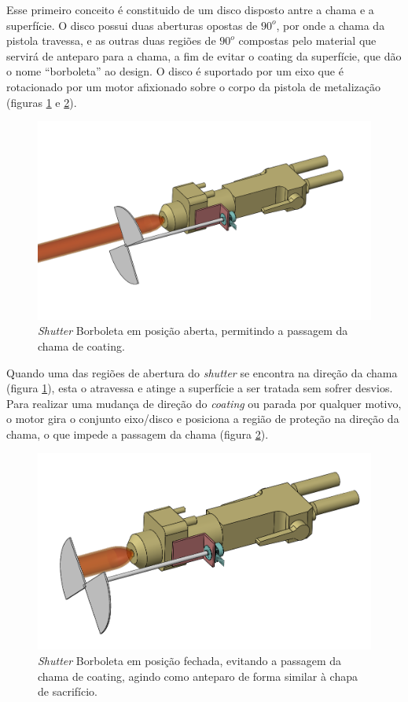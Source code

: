 Esse primeiro conceito é constituido de um disco disposto antre a chama e a
superfície. O disco possui duas aberturas opostas de $90^o$, por onde a chama da
pistola travessa, e as outras duas regiões de $90^o$ compostas pelo material que
servirá de anteparo para a chama, a fim de evitar o coating da superfície, que
dão o nome ``borboleta'' ao design.
O disco é suportado por um eixo que é rotacionado por um motor afixionado sobre o
corpo da pistola de metalização (figuras \ref{fig::borboleta_aberta} e
\ref{fig::borboleta_fechada}).

\begin{figure}[h!]
\centering
	\includegraphics[width=\columnwidth]{figs/estudo/shutter/Shutter_Borboleta_Aberto}
	\caption{\textit{Shutter} Borboleta em posição aberta, permitindo a passagem da chama
	de coating.}
	\label{fig::borboleta_aberta}
\end{figure}

Quando uma das regiões de abertura do \textit{shutter} se encontra na direção da
chama (figura \ref{fig::borboleta_aberta}), esta o atravessa e atinge a
superfície a ser tratada sem sofrer desvios. Para realizar uma mudança de
direção do \textit{coating} ou parada por qualquer motivo, o motor gira o conjunto
eixo/disco e posiciona a região de proteção na direção da chama, o que impede a passagem da
chama (figura \ref{fig::borboleta_fechada}).

\begin{figure}[h!]
\centering
	\includegraphics[width=\columnwidth]{figs/estudo/shutter/Shutter_Borboleta_Fechado}
	\caption{\textit{Shutter} Borboleta em posição fechada, evitando a passagem da chama
	de coating, agindo como anteparo de forma similar à chapa de sacrifício.}
	\label{fig::borboleta_fechada}
\end{figure}

